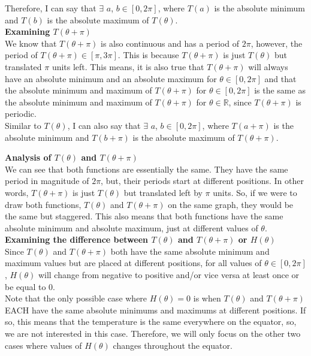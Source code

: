 \documentclass[12pt]{book}
\begin{document}
\begin{enumerate}
Therefore, I can say that $\exists$ $a$, $b \in [0, 2\pi]$, where $T(a)$ is the absolute minimum and $T(b)$ is the absolute maximum of $T(\theta)$.\\

\textbf{Examining $T(\theta+\pi)$}\\
We know that $T(\theta+\pi)$ is also continuous and has a period of $2\pi$, however, the period of $T(\theta+\pi) \in [\pi, 3\pi]$. This is because $T(\theta+\pi)$ is just $T(\theta)$ but translated $\pi$ units left. This means, it is also true that $T(\theta+\pi)$ will always have an absolute minimum and an absolute maximum for $\theta \in [0, 2\pi]$ and that the absolute minimum and maximum of $T(\theta+\pi)$ for $\theta \in [0,2\pi]$ is the same as the absolute minimum and maximum of $T(\theta+\pi)$ for $\theta \in \mathbb{R}$, since $T(\theta+\pi)$ is periodic.\\

Similar to $T(\theta)$, I can also say that $\exists$ $a$, $b \in [0, 2\pi]$, where $T(a+\pi)$ is the absolute minimum and $T(b+\pi)$ is the absolute maximum of $T(\theta+\pi)$.\\

\newpage

\textbf{Analysis of $T(\theta)$ and $T(\theta+\pi)$}\\
We can see that both functions are essentially the same. They have the same period in magnitude of $2\pi$, but, their periods start at different positions. In other words, $T(\theta+\pi)$ is just $T(\theta)$ but translated left by $\pi$ units. So, if we were to draw both functions, $T(\theta)$ and $T(\theta+\pi)$ on the same graph, they would be the same but staggered. This also means that both functions have the same absolute minimum and absolute maximum, just at different values of $\theta$.\\

\textbf{Examining the difference between $T(\theta)$ and $T(\theta+\pi)$ or $H(\theta)$}\\
Since $T(\theta)$ and $T(\theta+\pi)$ both have the same absolute minimum and maximum values but are placed at different positions, for all values of $\theta \in [0,2\pi]$, $H(\theta)$ will change from negative to positive and/or vice versa at least once or be equal to 0.\\

Note that the only possible case where $H(\theta)=0$ is when $T(\theta)$ and $T(\theta+\pi)$ EACH have the same absolute minimums and maximums at different positions. If so, this means that the temperature is the same everywhere on the equator, so, we are not interested in this case. Therefore, we will only focus on the other two cases where values of $H(\theta)$ changes throughout the equator.\\


\end{enumerate}
\end{document}
